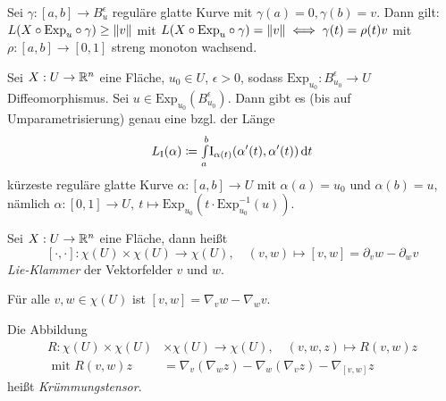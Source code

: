 \documentclass{cheat-sheet}
\newcommand{\I}{\mathrm{I}}
\newcommand{\Exp}{\mathrm{Exp}} %
\begin{document}

\begin{satz}
  Sei $\gamma : [a, b] \to B_u^\epsilon$ reguläre glatte Kurve mit $\gamma(a) = 0, \gamma(b) = v$. Dann gilt: $L(X \circ \Exp_u \circ \gamma) \geq \norm{v}$ mit $L(X \circ \Exp_u \circ \gamma) = \norm{v} \iff \gamma(t) = \rho(t)v$ mit $\rho : [a, b] \to [0, 1]$ streng monoton wachsend.
\end{satz}

\begin{satz}
  Sei $X : U \to \mathbb{R}^n$ eine Fläche, $u_0 \in U$, $\epsilon > 0$, sodass $\Exp_{u_0} : B_{u_0}^{\epsilon} \to U$ Diffeomorphismus. Sei $u \in \Exp_{u_0}(B_{u_0}^{\epsilon})$. Dann gibt es (bis auf Umparametrisierung) genau eine bzgl. der Länge
  \[ L_\I(\alpha) \coloneqq \Int{a}{b}{\I_{\alpha(t)}(\alpha'(t), \alpha'(t))}{t} \]
  kürzeste reguläre glatte Kurve $\alpha : [a, b] \to U$ mit $\alpha(a) = u_0$ und $\alpha(b) = u$, nämlich $\alpha : [0, 1] \to U, \  t \mapsto \Exp_{u_0}(t \cdot \Exp_{u_0}^{-1}(u))$.
\end{satz}



\begin{defn}
  Sei $X : U \to \mathbb{R}^n$ eine Fläche, dann heißt
  \[
    [\cdot,\cdot] : \chi(U) \times \chi(U) \to \chi(U), \quad
    (v, w) \mapsto [v, w] = \partial_v w - \partial_w v
  \]
  \emph{Lie-Klammer} der Vektorfelder $v$ und $w$.
\end{defn}

\begin{satz}
  Für alle $v, w \in \chi(U)$ ist $[v, w] = \nabla_v w - \nabla_w v$.
\end{satz}


\begin{defn}
  Die Abbildung
  \begin{align*}
    R : \chi(U) \times \chi(U) &\times \chi(U) \to \chi(U), \quad (v, w, z) \mapsto R(v, w) z \\
    \text{ mit } R(v, w) z &= \nabla_v (\nabla_w z) - \nabla_w (\nabla_v z) - \nabla_{[v, w]} z
  \end{align*}
  heißt \emph{Krümmungstensor}.
\end{defn}
\end{document}
